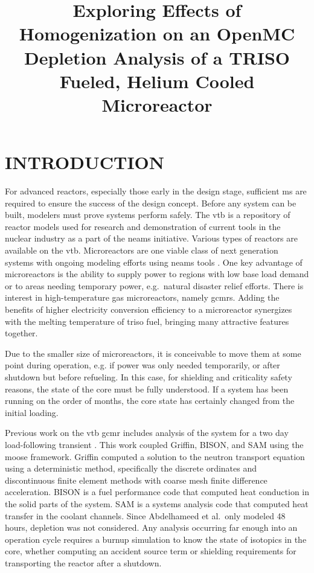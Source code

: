 \documentclass[letterpaper]{physor2024}
\title{Exploring Effects of Homogenization on an OpenMC Depletion Analysis of a TRISO Fueled, Helium Cooled Microreactor}
\begin{document}
\section{INTRODUCTION}\label{sec:intro}
For advanced reactors, especially those early in the design stage, sufficient \gls{ms} are required to ensure the success of the design concept. Before any system can be built, modelers must prove systems perform safely. The \gls{vtb} \cite{vtb2023} is a repository of reactor models used for research and demonstration of current tools in the nuclear industry as a part of the \gls{neams} initiative. Various types of reactors are available on the \gls{vtb}. Microreactors are one viable class of next generation systems with ongoing modeling efforts using \gls{neams} tools \cite{Stauff-preliminary-applications-2021, Stauff-applications-2022, Abdelhameed-ANS-2022}. One key advantage of microreactors is the ability to supply power to regions with low base load demand or to areas needing temporary power, e.g.~natural disaster relief efforts. There is interest in high-temperature gas microreactors, namely \glspl{gcmr}. Adding the benefits of higher electricity conversion efficiency to a microreactor synergizes with the melting temperature of \gls{triso} fuel, bringing many attractive features together.

Due to the smaller size of microreactors, it is conceivable to move them at some point during operation, e.g. if power was only needed temporarily, or after shutdown but before refueling. In this case, for shielding and criticality safety reasons, the state of the core must be fully understood. If a system has been running on the order of months, the core state has certainly changed from the initial loading.

Previous work on the \gls{vtb} \gls{gcmr} includes analysis of the system for a two day load-following transient \cite{Abdelhameed-ANS-2022}. This work coupled Griffin, BISON, and SAM using the \gls{moose} framework. Griffin computed a solution to the neutron transport equation using a deterministic method, specifically the discrete ordinates and discontinuous finite element methods with coarse mesh finite difference acceleration. BISON is a fuel performance code that computed heat conduction in the solid parts of the system. SAM is a systems analysis code that computed heat transfer in the coolant channels. Since Abdelhameed et al.~only modeled 48 hours, depletion was not considered. Any analysis occurring far enough into an operation cycle requires a burnup simulation to know the state of isotopics in the core, whether computing an accident source term or shielding requirements for transporting the reactor after a shutdown.
\end{document}
